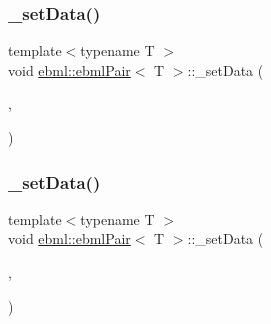 \mbox{\label{classebml_1_1ebmlPair_af03a41878253632d58c0af0a5121a411}} 
\subsubsection{\texorpdfstring{\+\_\+set\+Data()}{\_setData()}\hspace{0.1cm}{\footnotesize\ttfamily [2/5]}}
{\footnotesize\ttfamily template$<$typename T $>$ \\
void \mbox{\hyperlink{classebml_1_1ebmlPair}{ebml\+::ebml\+Pair}}$<$ T $>$\+::\+\_\+set\+Data (\begin{DoxyParamCaption}\item[{\mbox{\hyperlink{namespaceebml_adad533b7705a16bb360fe56380c5e7be}{ebml\+Element\+\_\+sp}} \&\&}]{,  }\item[{\mbox{\hyperlink{namespaceebml_adad533b7705a16bb360fe56380c5e7be}{ebml\+Element\+\_\+sp}} \&\&}]{ }\end{DoxyParamCaption})\hspace{0.3cm}{\ttfamily [protected]}}

\mbox{\label{classebml_1_1ebmlPair_a1da4edfcf6f4709e7a33017a3f93dc29}} 
\subsubsection{\texorpdfstring{\+\_\+set\+Data()}{\_setData()}\hspace{0.1cm}{\footnotesize\ttfamily [3/5]}}
{\footnotesize\ttfamily template$<$typename T $>$ \\
void \mbox{\hyperlink{classebml_1_1ebmlPair}{ebml\+::ebml\+Pair}}$<$ T $>$\+::\+\_\+set\+Data (\begin{DoxyParamCaption}\item[{const T \&}]{,  }\item[{const \mbox{\hyperlink{namespaceebml_adad533b7705a16bb360fe56380c5e7be}{ebml\+Element\+\_\+sp}} \&}]{ }\end{DoxyParamCaption})\hspace{0.3cm}{\ttfamily [protected]}}

